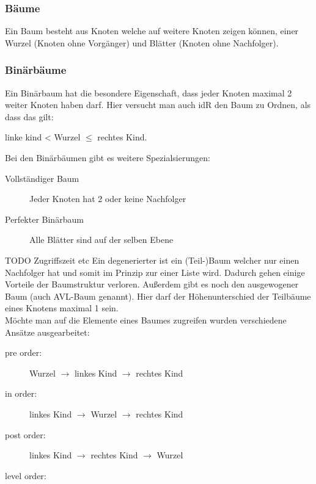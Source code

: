\documentclass[a4paper]{scrartcl}
\begin{document}
            \subsubsection*{\large{Bäume}}
            Ein Baum besteht aus Knoten welche auf weitere Knoten zeigen können, einer Wurzel (Knoten ohne Vorgänger) und Blätter (Knoten ohne Nachfolger). 
            \subsubsection*{Binärbäume}
                Ein Binärbaum hat die besondere Eigenschaft, dass jeder Knoten maximal 2 weiter Knoten haben darf. Hier versucht man auch idR den Baum zu Ordnen, als dass das  gilt: 
                \begin{center}    
                    linke kind < Wurzel \(\leq\) rechtes Kind.
                \end{center}
                Bei den Binärbäumen gibt es weitere Spezialsierungen:
                
                \begin{description}
                    \item[Vollständiger Baum] Jeder Knoten hat 2 oder keine Nachfolger
                    \item[Perfekter Binärbaum] Alle Blätter sind auf der selben Ebene 
                \end{description}
                TODO Zugriffszeit etc
                Ein degenerierter ist ein (Teil-)Baum welcher nur einen Nachfolger hat und somit im Prinzip zur einer Liste wird. Dadurch gehen einige Vorteile der Baumstruktur verloren.
                Außerdem gibt es noch den ausgewogener Baum (auch AVL-Baum genannt). Hier darf der Höhenunterschied der Teilbäume eines Knotens maximal 1 sein. \\
                Möchte man auf die Elemente eines Baumes zugreifen wurden verschiedene Ansätze ausgearbeitet: 
                \begin{description}
                    \item[pre   order:] Wurzel \(\rightarrow\) linkes Kind \(\rightarrow\) rechtes Kind
                    \item[in    order:] linkes Kind \(\rightarrow\) Wurzel \(\rightarrow\) rechtes Kind
                    \item[post  order:] linkes Kind \(\rightarrow\) rechtes Kind \(\rightarrow\) Wurzel
                    \item[level order:]    
                \end{description} 
\end{document}
